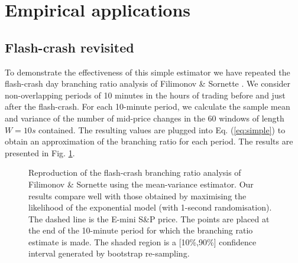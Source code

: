 \documentclass{article}
\begin{document}
\section{Empirical applications}

\subsection{Flash-crash revisited}

To demonstrate the effectiveness of this simple estimator we have repeated the
flash-crash day branching ratio analysis of Filimonov \& Sornette
{\cite{filimonov}}. We consider non-overlapping periods of 10 minutes in the
hours of trading before and just after the flash-crash. For each 10-minute
period, we calculate the sample mean and variance of the number of mid-price
changes in the 60 windows of length $W = 10 s$ contained. The resulting values
are plugged into Eq. (\ref{eq:simple}) to obtain an approximation of the
branching ratio for each period. The results are presented in Fig.
\ref{fig:flashcrash}.

\begin{figure}[h]
  \caption{\label{fig:flashcrash} Reproduction of the flash-crash branching
  ratio analysis of Filimonov \& Sornette using the mean-variance estimator.
  Our results compare well with those obtained by maximising the likelihood of
  the exponential model (with 1-second randomisation). The dashed line is the
  E-mini S\&P price. The points are placed at the end of the 10-minute period
  for which the branching ratio estimate is made. The shaded region is a
  [10\%,90\%] confidence interval generated by bootstrap re-sampling.}
\end{figure}
\end{document}
